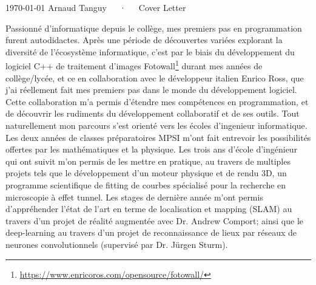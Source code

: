 \documentclass[11pt, a4paper]{awesome-cv}
\begin{document}
\makecvheader[R]

\makecvfooter
  {\today}
  {Arnaud Tanguy~~~·~~~Cover Letter}
  {}

\makelettertitle

\begin{cvletter}

  Passionné d'informatique depuis le collège, mes premiers pas en programmation furent autodidactes. Après une période de découvertes variées explorant la diversité de l'écosystème informatique, c'est par le biais du développement du logiciel C++ de traitement d'images Fotowall\footnote{\url{https://www.enricoros.com/opensource/fotowall/}} durant mes années de collège/lycée, et ce en collaboration avec le développeur italien Enrico Ross, que j'ai réellement fait mes premiers pas dans le monde du développement logiciel. Cette collaboration m'a permis d'étendre mes compétences en programmation, et de découvrir les rudiments du développement collaboratif et de ses outils. Tout naturellement mon parcours s'est orienté vers les écoles d'ingenieur informatique. Les deux années de classes préparatoires MPSI m'ont fait entrevoir les possibilités offertes par les mathématiques et la physique. Les trois ans d'école d'ingénieur qui ont suivit m'on permis de les mettre en pratique, au travers de multiples projets tels que le développement d'un moteur physique et de rendu 3D, un programme scientifique de fitting de courbes spécialisé pour la recherche en microscopie à effet tunnel. Les stages de dernière année m'ont permis d'appréhender l'état de l'art en terme de localisation et mapping (SLAM) au travers d'un projet de réalité augmentée avec Dr. Andrew Comport; ainsi que le deep-learning au travers d'un projet de reconnaissance de lieux par réseaux de neurones convolutionnels (supervisé par Dr. Jürgen Sturm).


\end{cvletter}
\end{document}
